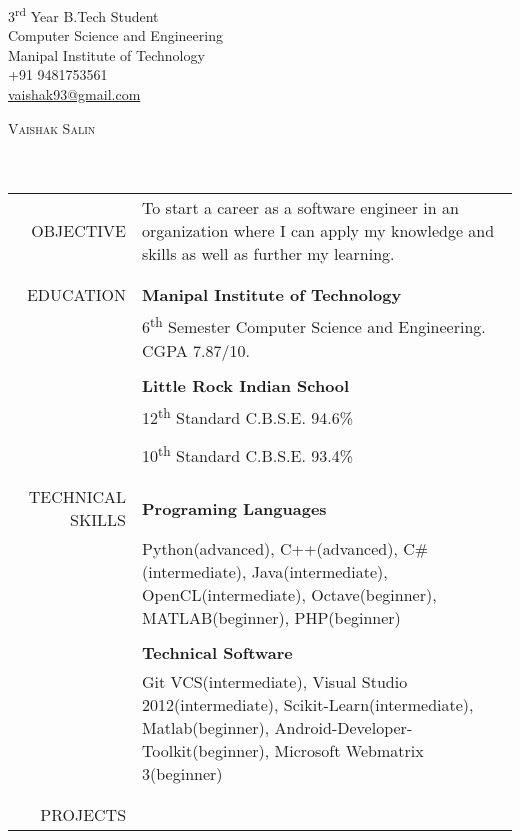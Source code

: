 \documentclass[a4paper, 10pt]{article}
\begin{document}
	\pagestyle{empty} %
	\begin{flushright}		
		3\textsuperscript{rd} Year B.Tech Student \\
		Computer Science and Engineering \\
		Manipal Institute of Technology \\
		+91 9481753561 \\
		\href{mailto: vaishak93@gmail.com}{vaishak93@gmail.com} \\
	\end{flushright}
	{\textsc {\Huge Vaishak Salin}} \\\\\\
	\begin{tabular}{rp{13cm}}
		OBJECTIVE 
		& To start a career as a software engineer in an organization where I can 
		apply my knowledge and skills as well as further my learning. \\\\
		\hline
		\\
		EDUCATION
		& {\bf Manipal Institute of Technology} \\
		& 6\textsuperscript{th} Semester Computer Science and Engineering. 
		CGPA 7.87/10. \\\\
		& {\bf Little Rock Indian School} \\
		& 12\textsuperscript{th} Standard C.B.S.E. 94.6\% \\\\
		& 10\textsuperscript{th} Standard C.B.S.E. 93.4\% \\\\
		\hline
		\\
		TECHNICAL SKILLS
		& {\bf Programing Languages} \\
		& Python(advanced), C++(advanced), C\#(intermediate), 
		Java(intermediate), OpenCL(intermediate), Octave(beginner),
		MATLAB(beginner), PHP(beginner) \\\\
		& {\bf Technical Software} \\
		& Git VCS(intermediate), Visual Studio 2012(intermediate), 
		Scikit-Learn(intermediate), Matlab(beginner), 
		Android-Developer-Toolkit(beginner), 
		Microsoft Webmatrix 3(beginner) \\\\
		\hline
		\\
		PROJECTS
		& \vspace{-5mm} \begin{itemize} 

\end{itemize}
\end{tabular}
\end{document}
